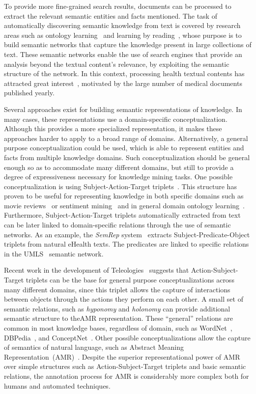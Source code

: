   To provide more fine-grained search results, documents can be processed to extract the relevant semantic entities and facts mentioned.
The task of automatically discovering semantic knowledge from text is covered by research areas
such as ontology learning~\cite{cimiano2009ontology} and {learning by reading}~\cite{barker2007learning},
whose purpose is to build semantic networks that {capture} the knowledge present in large collections of text.
These semantic networks enable the use of search engines that provide an analysis beyond the textual content's relevance, by exploiting the semantic structure of the network.
In this context, processing health textual contents has attracted {great interest}~\cite{gonzalez2017capturing}, motivated by the large number of medical documents published yearly.

Several approaches exist for building semantic representations of knowledge.
In many cases, these representations use a domain-specific conceptualization.
Although this provides a more specialized representation, it makes these approaches harder to apply to a broad range of domains.
Alternatively, a general purpose conceptualization could be used, which is able to represent entities and facts from multiple knowledge domains.
Such conceptualization should be general enough so as to accommodate many different domains, but still to provide a degree of expressiveness necessary for knowledge mining tasks.
One possible conceptualization is using
{Subject-Action-Target triplets}~\cite{suilan2018}.
This structure has proven to be useful for representing knowledge in both specific
domains such as movie reviews~\cite{suilan2018} or sentiment
mining~\cite{emotinet} and in {general domain ontology learning}~\cite{mitchell2018never}. %
Furthermore, Subject-Action-Target triplets automatically extracted from text can be
later linked to domain-specific relations through the use of semantic networks.
As an example, the \textit{SemRep} system~\cite{semrep} extracts Subject-Predicate-Object
triplets from natural eHealth texts. The predicates are linked to specific relations
in the UMLS~\cite{umls} semantic network.

Recent work in the development of Teleologies~\cite{teleologies} suggests that Action-Subject-Target triplets can be the base for general purpose conceptualizations across many different domains, since this triplet allows the capture of interactions between objects through the actions they perform on each other.
A small set of semantic relations, such as \textit{hyponomy} and
\textit{holonomy} can provide additional semantic structure to theAMR
representation. These ``general'' relations are common in most knowledge bases,
regardless of domain, such as WordNet~\cite{miller1998wordnet},
DBPedia~\cite{lehmann2015dbpedia}, and ConceptNet~\cite{conceptnet}.
Other possible conceptualizations allow the capture of semantics of natural language,
such as Abstract Meaning Representation~(AMR)~\cite{amr}. Despite the superior representational
power of AMR over simple structures such as Action-Subject-Target triplets {and basic semantic
relations}, the annotation process for AMR is considerably more complex both for humans and automated techniques.

